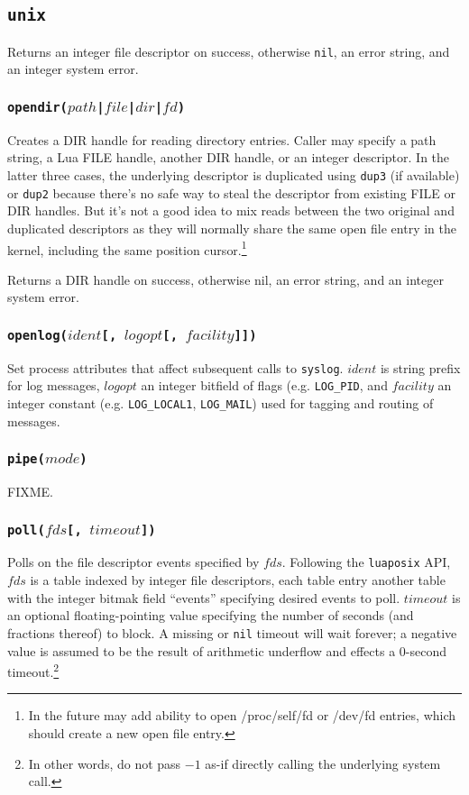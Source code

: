 \documentclass[11pt, oneside]{memoir}
\newcommand*{\luaposix}[0]{\texttt{luaposix}\xspace}
\newcommand*{\nil}[0]{\texttt{nil}\xspace}
\newcommand*{\syscall}[1]{\texttt{#1}\xspace}
\newcommand*{\fn}[1]{\texttt{#1}\xspace}
\newcounter{toccols}
\newenvironment{Module}[1]{
	\subsection{\texttt{#1}}
	\addtocontents{toc}{
		\protect\begin{multicols}{\value{toccols}}
	}
}{
	\addtocontents{toc}{\protect\end{multicols}}
}
\begin{document}
\begin{Module}{unix}
Returns an integer file descriptor on success, otherwise \nil, an error string, and an integer system error.

\subsubsection[\fn{opendir}]{\fn{opendir($path$|$file$|$dir$|$fd$)}}

Creates a DIR handle for reading directory entries. Caller may specify a path string, a Lua FILE handle, another DIR handle, or an integer descriptor. In the latter three cases, the underlying descriptor is duplicated using \syscall{dup3} (if available) or \syscall{dup2} because there's no safe way to steal the descriptor from existing FILE or DIR handles. But it's not a good idea to mix reads between the two original and duplicated descriptors as they will normally share the same open file entry in the kernel, including the same position cursor.\footnote{In the future may add ability to open /proc/self/fd or /dev/fd entries, which should create a new open file entry.}

Returns a DIR handle on success, otherwise nil, an error string, and an integer system error.

\subsubsection[\fn{openlog}]{\fn{openlog($ident$[, $logopt$[, $facility$]])}}

Set process attributes that affect subsequent calls to \fn{syslog}. $ident$ is string prefix for log messages, $logopt$ an integer bitfield of flags (e.g. \texttt{LOG\_PID}, and $facility$ an integer constant (e.g. \texttt{LOG\_LOCAL1}, \texttt{LOG\_MAIL}) used for tagging and routing of messages.

\subsubsection[\fn{pipe}]{\fn{pipe($mode$)}}

FIXME.

\subsubsection[\fn{poll}]{\fn{poll($fds$[, $timeout$])}}

Polls on the file descriptor events specified by $fds$. Following the \luaposix API, $fds$ is a table indexed by integer file descriptors, each table entry another table with the integer bitmak field ``events'' specifying desired events to poll. $timeout$ is an optional floating-pointing value specifying the number of seconds (and fractions thereof) to block. A missing or \nil timeout will wait forever; a negative value is assumed to be the result of arithmetic underflow and effects a 0-second timeout.\footnote{In other words, do not pass $-1$ as-if directly calling the underlying system call.}


\end{Module}
\end{document}
